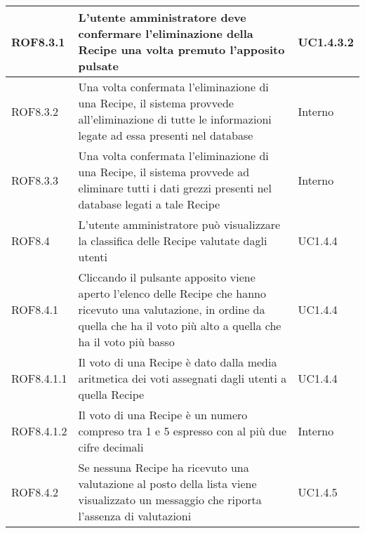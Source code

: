 \begin{center}
\begin{longtable}{| p{2.5cm} | p{8cm} | p{2cm} |}
		\hline
		ROF8.3.1  &  L'utente amministratore deve confermare l'eliminazione della Recipe una volta premuto l'apposito pulsate  &  UC1.4.3.2 \\
		\hline
		ROF8.3.2  &  Una volta confermata l'eliminazione di una Recipe, il sistema provvede all'eliminazione di tutte le informazioni legate ad essa presenti nel database  &  Interno \\
		\hline
		ROF8.3.3  &  Una volta confermata l'eliminazione di una Recipe, il sistema provvede ad eliminare tutti i dati grezzi presenti nel database legati a tale Recipe  &  Interno \\
		\hline
		ROF8.4 & L'utente amministratore può visualizzare la classifica delle Recipe valutate dagli utenti  & UC1.4.4  \\
		\hline
		ROF8.4.1 & Cliccando il pulsante apposito viene aperto l'elenco delle Recipe che hanno ricevuto una valutazione, in ordine da quella che ha il voto più alto a quella che ha il voto più basso  & UC1.4.4  \\
		\hline
		ROF8.4.1.1 & Il voto di una Recipe è dato dalla media aritmetica dei voti assegnati dagli utenti a quella Recipe  & UC1.4.4  \\
		\hline
		ROF8.4.1.2 & Il voto di una Recipe è un numero compreso tra 1 e 5 espresso con al più due cifre decimali  &  Interno  \\
		\hline
		ROF8.4.2 & Se nessuna Recipe ha ricevuto una valutazione al posto della lista viene visualizzato un messaggio che riporta l'assenza di valutazioni  & UC1.4.5  \\
		\hline




\end{longtable}
\end{center}

